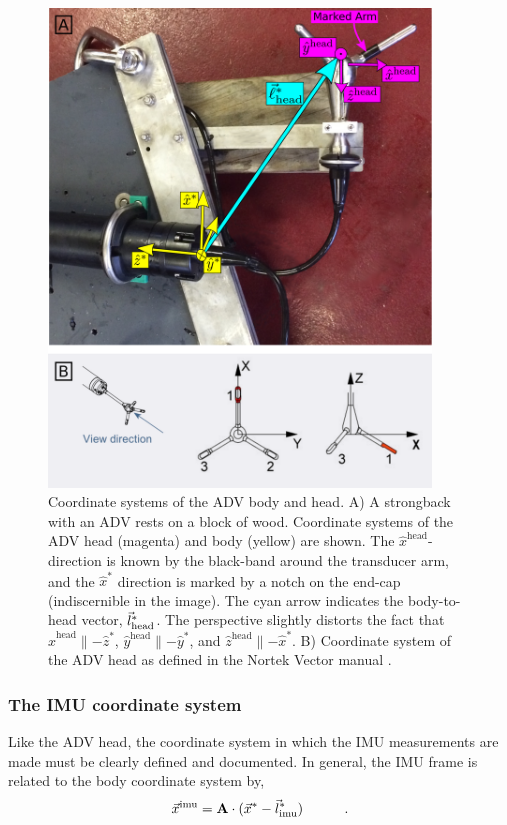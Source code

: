 \documentclass[twocol]{ametsoc}
\begin{document}
\begin{figure}
  \centering
    \includegraphics[width=4in]{ADV_coord_sys4}
  \caption{Coordinate systems of the ADV body and head. A) A strongback with an ADV rests on a block of wood. Coordinate systems of the ADV head (magenta) and body (yellow) are shown. The $\hat{x}^\mathrm{head}$-direction is known by the black-band around the transducer arm, and the $\hat{x}^*$ direction is marked by a notch on the end-cap (indiscernible in the image). The cyan arrow indicates the body-to-head vector, $\vec{l}_\mathrm{head}^*$.  The perspective slightly distorts the fact that  $\hat{x}^\mathrm{head} \parallel -\hat{z}^* $, $\hat{y}^\mathrm{head} \parallel -\hat{y}^* $, and $\hat{z}^\mathrm{head} \parallel -\hat{x}^* $.  B) Coordinate system of the ADV head as defined in the Nortek Vector manual \cite[]{vector_manual2005}. }
  \label{fig:adv-coord-sys}
\end{figure}

\subsubsection{The IMU coordinate system}\label{apdx:coord-sys:imu}

Like the ADV head, the coordinate system in which the IMU measurements are made must be clearly defined and documented. In general, the IMU frame is related to the body coordinate system by,
\begin{align*}
  \vec{x}^\mathrm{imu} &= \mathbf{A}  \cdot (\vec{x}^* - \vec{l}^*_\mathrm{imu}) & \qquad .
\end{align*}
\end{document}
